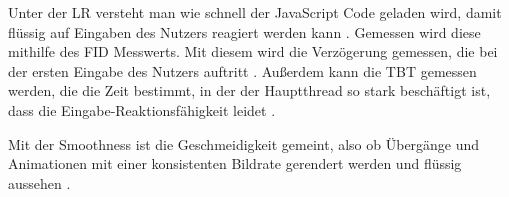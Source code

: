 Unter der \ac{LR} versteht man wie schnell der JavaScript Code geladen wird, damit flüssig auf Eingaben des Nutzers reagiert werden kann \cite{PerformanceMetrics}. Gemessen wird diese mithilfe des \ac{FID} Messwerts. Mit diesem wird die Verzögerung gemessen, die bei der ersten Eingabe des Nutzers auftritt \cite{FID}. Außerdem kann die \ac{TBT} gemessen werden, die die Zeit bestimmt, in der der Hauptthread so stark beschäftigt ist, dass die Eingabe-Reaktionsfähigkeit leidet \cite{TBT}.

Mit der Smoothness ist die Geschmeidigkeit gemeint, also ob Übergänge und Animationen mit einer konsistenten Bildrate gerendert werden und flüssig aussehen \cite{PerformanceMetrics}.
